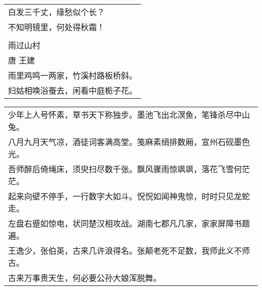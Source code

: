 \nopagebreak%
\nopagebreak%
\noindent\begin{minipage}{\linewidth}
  \vskip-3pt\begin{table}[H]
    \centering
    \begin{tabular}{@{}l@{}}
白发三千丈，缘愁似个长？\\
不知明镜里，何处得秋霜！\\
\\
雨过山村\\
唐  王建\\
雨里鸡鸣一两家，竹溪村路板桥斜。\\
妇姑相唤浴蚕去，闲看中庭栀子花。
    \end{tabular}
  \end{table}
\end{minipage}
\vspace{1cm}


\nopagebreak%
\nopagebreak%
\noindent\begin{minipage}{\linewidth}
  \vskip-3pt\begin{table}[H]
    \centering
    \begin{tabular}{@{}l@{}}
少年上人号怀素，草书天下称独步。墨池飞出北溟鱼，笔锋杀尽中山兔。\\
八月九月天气凉，酒徒词客满高堂。笺麻素绢排数厢，宣州石砚墨色光。\\
吾师醉后倚绳床，须臾扫尽数千张。飘风骤雨惊飒飒，落花飞雪何茫茫。\\
起来向壁不停手，一行数字大如斗。怳怳如闻神鬼惊，时时只见龙蛇走。\\
左盘右蹙如惊电，状同楚汉相攻战。湖南七郡凡几家，家家屏障书题遍。\\
王逸少，张伯英，古来几许浪得名。张颠老死不足数，我师此义不师古。\\
古来万事贵天生，何必要公孙大娘浑脱舞。
    \end{tabular}
  \end{table}
\end{minipage}
\vspace{1cm}


